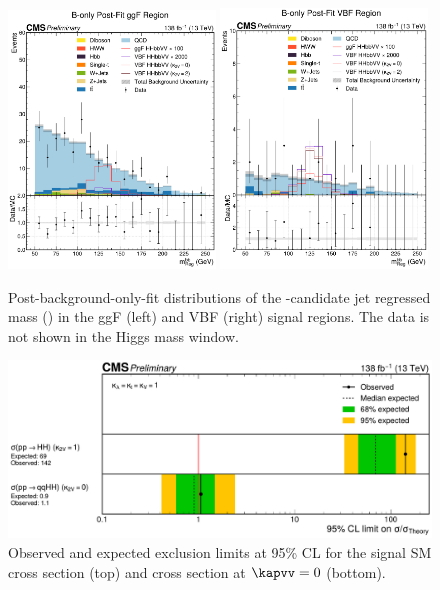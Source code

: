 \begin{figure}[hbt!]
\centering
\includegraphics[trim={0 0 0 15mm},clip,width=0.49\textwidth]{figures/05-HH/results_nonres/postfit_passggf_bbFatJetParticleNetMass.pdf}
\includegraphics[trim={0 0 0 15mm},clip,width=0.49\textwidth]{figures/05-HH/results_nonres/postfit_passvbf_bbFatJetParticleNetMass.pdf}
\caption{Post-background-only-fit distributions of the \bbbar-candidate jet regressed mass (\mregbb) in the ggF (left) and VBF (right) signal regions.
The data is not shown in the Higgs mass window.
\label{fig:05_results_hh_postfit}
}
\end{figure}

\begin{figure}[hbt!]
\centering
\includegraphics[width=\textwidth]{figures/05-HH/results_nonres/UL_combined.pdf}
\caption{Observed and expected exclusion limits at 95\% CL for the \HHbbVV signal SM cross section (top) and cross section at $\kapvv=0$ (bottom).
\label{fig:05_results_hh_UL}
}
\end{figure}

